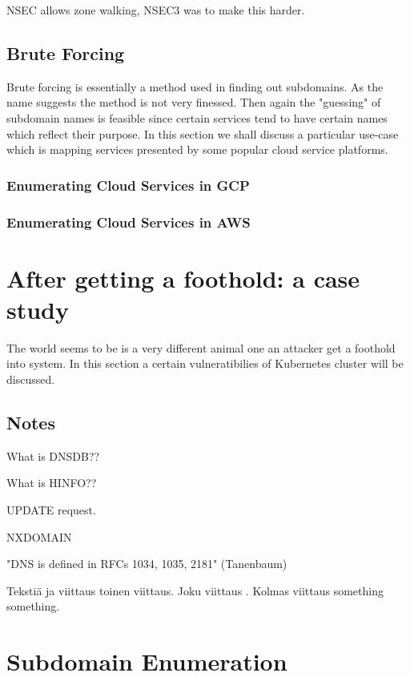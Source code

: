 NSEC allows zone walking, NSEC3 was to make this harder.

\subsection{Brute Forcing}

Brute forcing is essentially a method used in finding out subdomains. As the name suggests the method is not very finessed. Then again the "guessing" of subdomain names is feasible since certain services tend to have certain names which reflect their purpose. In this section we shall discuss a particular use-case which is mapping services presented by some popular cloud service platforms.

\subsubsection{Enumerating Cloud Services in GCP}

\subsubsection{Enumerating Cloud Services in AWS}

\section{After getting a foothold: a case study}

The world seems to be is a very different animal one an attacker get a foothold into system. In this section a certain vulneratibilies of Kubernetes cluster will be discussed.






\subsection{Notes}

What is  DNSDB??

What is HINFO??

UPDATE request.

NXDOMAIN

"DNS is defined in RFCs 1034, 1035, 2181" (Tanenbaum)

Tekstiä ja viittaus \cite{tanenbaum} toinen viittaus.
Joku viittaus \citep{kurose_ross}. Kolmas viittaus
\cite{zone_poisoning} something \cite{dns_privacy} something.

\section{Subdomain Enumeration}





